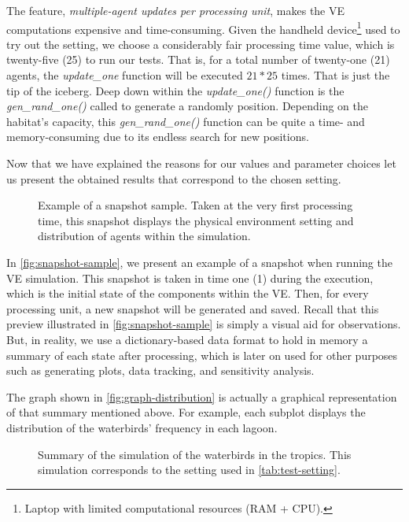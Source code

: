 The feature, \emph{multiple-agent updates per processing unit}, makes the VE computations expensive and time-consuming. Given the handheld device\footnote{Laptop with limited computational resources (RAM + CPU).} used to try out the setting, we choose a considerably fair processing time value, which is twenty-five (25) to run our tests. That is, for a total number of twenty-one (21) agents, the \emph{update\_one} function will be executed $21 * 25$ times. That is just the tip of the iceberg. Deep down within the \emph{update\_one()} function is the \emph{gen\_rand\_one()} called to generate a randomly  position. Depending on the habitat's capacity, this \emph{gen\_rand\_one()} function can be quite a time- and memory-consuming due to its endless search for new positions.


Now that we have explained the reasons for our values and parameter choices let us present the obtained results that correspond to the chosen setting.
\begin{figure}[!ht]
    \centering
    \caption{Example of a snapshot sample. Taken at the very first processing time, this snapshot displays the physical environment setting and distribution of agents within the simulation.}
    \label{fig:snapshot-sample}
\end{figure}

In \autoref{fig:snapshot-sample}, we present an example of a snapshot when running the VE simulation. This snapshot is taken in time one (1) during the execution, which is the initial state of the components within the VE. Then, for every processing unit, a new snapshot will be generated and saved. Recall that this preview illustrated in \autoref{fig:snapshot-sample} is simply a visual aid for observations. But, in reality, we use a dictionary-based data format to hold in memory a summary of each state after processing, which is later on used for other purposes such as generating plots, data tracking, and sensitivity analysis.

The graph shown in \autoref{fig:graph-distribution} is actually a graphical representation of that summary mentioned above. For example, each subplot displays the distribution of the waterbirds' frequency in each lagoon.
\begin{figure}[!ht]
    \centering
    \caption{Summary of the simulation of the waterbirds in the tropics. This simulation corresponds to the setting used in \autoref{tab:test-setting}.}
    \label{fig:graph-distribution}
\end{figure}

